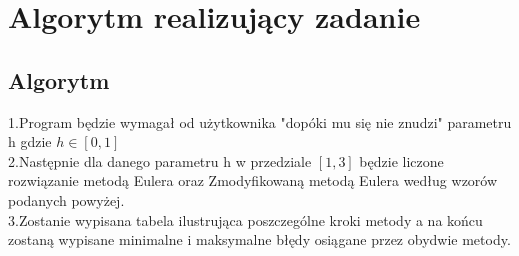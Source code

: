 \documentclass[10pt]{article} %
\begin{document}
\section{Algorytm realizujący zadanie}
\subsection{Algorytm}
1.Program będzie wymagał od użytkownika "dopóki mu się nie znudzi" parametru h gdzie $h \in [0,1]$\\
2.Następnie dla danego parametru h w przedziale $[1,3]$ będzie liczone rozwiązanie metodą Eulera oraz Zmodyfikowaną metodą Eulera według wzorów podanych powyżej. \\
3.Zostanie wypisana tabela ilustrująca poszczególne kroki metody a na końcu zostaną wypisane minimalne i maksymalne błędy osiągane przez obydwie metody.\\
\end{document}

